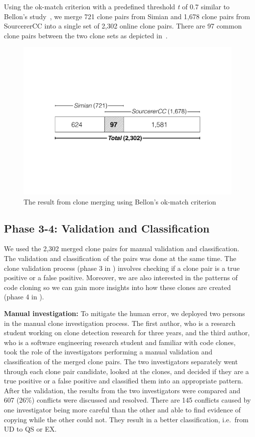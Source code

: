 \documentclass[10pt,journal,compsoc]{IEEEtran}
\begin{document}
Using the ok-match criterion with a predefined threshold \textit{t} of 0.7
similar to Bellon's study~\cite{Bellon2007}, we merge 721 clone pairs from
Simian and 1,678 clone pairs from SourcererCC into a single set of 2,302 online
clone pairs. There are 97 common clone pairs between the two clone sets 
as depicted in~.

\begin{figure}
	\centering
	\includegraphics[width=0.8\linewidth]{clone_merging}
	\caption{The result from clone merging using Bellon's ok-match criterion}
	\label{fig:clonemerging}
\end{figure}

\subsection{Phase 3-4: Validation and Classification}
We used the 2,302 merged clone pairs for
manual validation and classification.
The validation and classification of the pairs was done at the same time. 
The clone validation process (phase 3 in ) involves checking 
if a clone pair is a true positive or a false positive. 
Moreover, we are also interested in 
the patterns of code cloning so we can gain more insights into 
how these clones are created (phase 4 in ). 

\textbf{Manual investigation:} 
To mitigate the human error, we deployed two persons in the manual clone
investigation process. The first author, who is a research student working on
clone detection research for three years, and the third author, who is a
software engineering research student and familiar with code clones, took the
role of the investigators performing a manual validation and classification of
the merged clone pairs. The two investigators separately went through each clone
pair candidate, looked at the clones, and decided if they are a true positive or
a false positive and classified them into an appropriate pattern. After the
validation, the results from the two investigators were compared and 607 (26\%)
conflicts were discussed and resolved. There are 145 conflicts caused by
one investigator being more careful than the other and able to find evidence of 
copying while the other could not. They result in a better classification,
 i.e.~from UD to QS or EX. 
\end{document}
